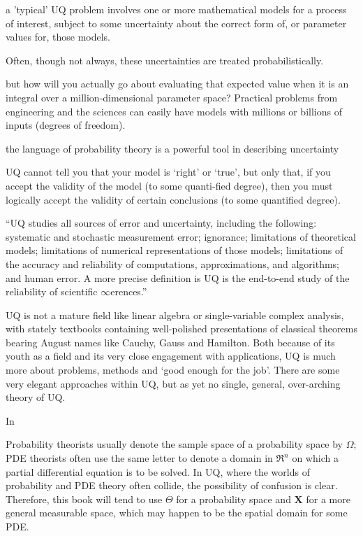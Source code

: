 a 'typical' UQ problem involves one or more mathematical models for a process of interest, subject to some uncertainty about the correct form of, or parameter values for, those models. %

Often, though not always, these uncertainties are treated probabilistically. %

but how will you actually go about evaluating that expected value when it is an integral over a million-dimensional parameter space?
Practical problems from engineering and the sciences can easily have models with millions or billions of inputs
(degrees of freedom). %

the language of probability theory is a powerful tool in describing uncertainty %

UQ cannot tell you that your model is ‘right’ or ‘true’, but only that, if you accept the validity of the model (to some quanti-fied degree), then you must logically accept the validity of certain conclusions (to some quantified degree). \cite{Sullivan2015}

“UQ studies all sources of error and uncertainty, including the following: systematic and stochastic measurement error; ignorance; limitations of theoretical models; limitations of numerical representations of those models; limitations of the accuracy and reliability of computations, approximations, and algorithms; and human error. A more precise definition is UQ is the end-to-end study of the reliability of scientific
$\infty$erences.” %

UQ is not a mature field like linear algebra or single-variable complex analysis, with stately textbooks containing well-polished presentations of classical theorems bearing August names like Cauchy, Gauss and Hamilton. Both because of its youth as a field and its very close engagement with applications, UQ is much more about problems, methods and ‘good enough for the job’. There are some very elegant approaches within UQ, but as yet no single, general, over-arching theory of UQ. %

In %

Probability theorists usually denote the sample space of a probability space by $\Omega$; PDE theorists often use the same letter to denote a domain in $\Re^{n}$ on which a partial differential equation is to be solved. In UQ, where the worlds of probability and PDE theory often collide, the possibility of confusion is clear. Therefore, this book will tend to use $\Theta$ for a probability space and \textbf{X} for a more general measurable space, which may happen to be the spatial domain for some PDE.
